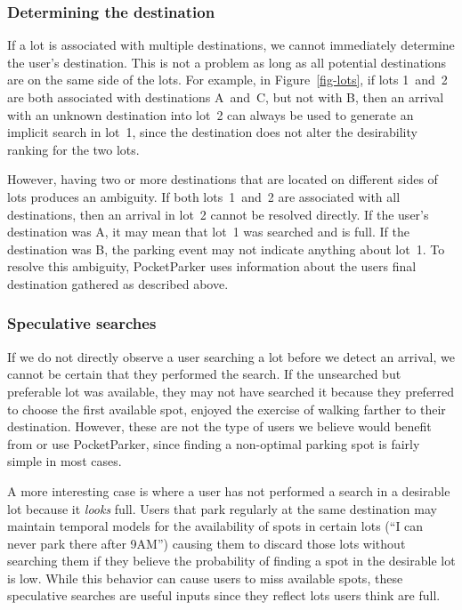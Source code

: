 \subsubsection{Determining the destination}

If a lot is associated with multiple destinations, we cannot immediately
determine the user's destination.  This is not a problem as long as all
potential destinations are on the same side of the lots.  For example, in
Figure~\ref{fig-lots}, if lots 1~and~2 are both associated with destinations
A~and~C, but not with B, then an arrival with an unknown destination into lot~2
can always be used to generate an implicit search in lot~1, since the
destination does not alter the desirability ranking for the two lots.

However, having two or more destinations that are located on different sides of
lots produces an ambiguity.  If both lots~1~and~2 are associated with all
destinations, then an arrival in lot~2 cannot be resolved directly. If the
user's destination was A, it may mean that lot~1 was searched and is full.
If the destination was B, the parking event may not indicate anything about
lot~1. To resolve this ambiguity, PocketParker uses information about the users
final destination gathered as described above.

\subsubsection{Speculative searches}

If we do not directly observe a user searching a lot before we detect an
arrival, we cannot be certain that they performed the search. If the unsearched
but preferable lot was available, they may not have searched it because they
preferred to choose the first available spot, enjoyed the exercise of walking
farther to their destination. However, these are not the type of users we
believe would benefit from or use PocketParker, since finding a
non-optimal parking spot is fairly simple in most cases.

A more interesting case is where a user has not performed a search in a
desirable lot because it \textit{looks} full. Users that park regularly at
the same destination may maintain temporal models for the availability of
spots in certain lots (``I can never park there after 9AM'') causing them to
discard those lots without searching them if they believe the probability of
finding a spot in the desirable lot is low. While this behavior can cause
users to miss available spots, these speculative searches are useful inputs
since they reflect lots users think are full.

